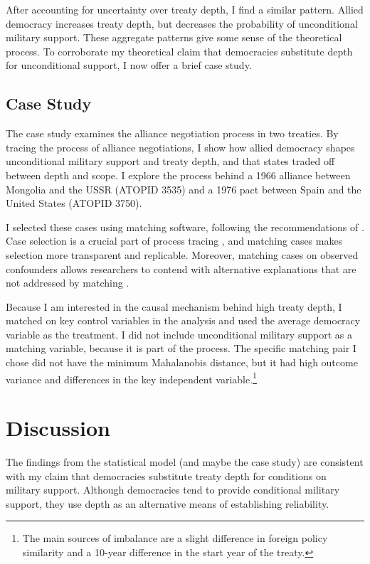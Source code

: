 \documentclass[12pt]{article}
\begin{document}
After accounting for uncertainty over treaty depth, I find a similar pattern. 
Allied democracy increases treaty depth, but decreases the probability of unconditional military support. 
These aggregate patterns give some sense of the theoretical process. 
To corroborate my theoretical claim that democracies substitute depth for unconditional support, I now offer a brief case study. 


\subsection{Case Study}


The case study examines the alliance negotiation process in two treaties. 
By tracing the process of alliance negotiations, I show how allied democracy shapes unconditional military support and treaty depth, and that states traded off between depth and scope. 
I explore the process behind a 1966 alliance between Mongolia and the USSR (ATOPID 3535) and a 1976 pact between Spain and the United States (ATOPID 3750). 


I selected these cases using matching software, following the recommendations of \citet{Nielsen2016}. 
Case selection is a crucial part of process tracing \citep{SeawrightGerring2008}, and matching cases makes selection more transparent and replicable. 
Moreover, matching cases on observed confounders allows researchers to contend with alternative explanations that are not addressed by matching \citep{Nielsen2016}. 


Because I am interested in the causal mechanism behind high treaty depth, I matched on key control variables in the analysis and used the average democracy variable as the treatment. 
I did not include unconditional military support as a matching variable, because it is part of the process. 
The specific matching pair I chose did not have the minimum Mahalanobis distance, but it had high outcome variance and differences in the key independent variable.\footnote{The main sources of imbalance are a slight difference in foreign policy similarity and a 10-year difference in the start year of the treaty.} 


\section{Discussion}


The findings from the statistical model (and maybe the case study) are consistent with my claim that democracies substitute treaty depth for conditions on military support. 
Although democracies tend to provide conditional military support, they use depth as an alternative means of establishing reliability. 
\end{document}
